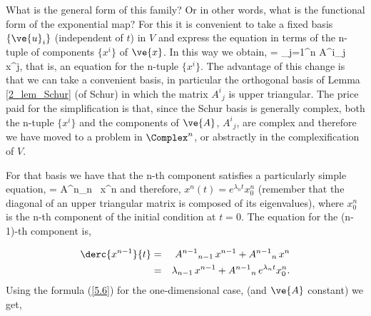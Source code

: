 
\noi What is the general form of this family? Or in other words,
what is the functional form of the exponential map?
For this it is convenient to take a fixed basis $\{\ve{u}_i\}$
(independent of $t$) in $V$ 
and express the equation in terms of the n-tuple of components $\{x^i\}$
of $\ve{x}$.
In this way we obtain,
\beq
{}= \sum_{j=1}^n A^i{}_j \, x^j,      \label{eqn:5.7_b}
\eeq
that is, an equation for the n-tuple $\{x^i\}$.
The advantage of this change is that we can take a convenient basis,
in particular the orthogonal basis of Lemma \ref{2_lem_Schur} (of Schur)
in which the matrix $A^i{}_j$ is upper triangular.
The price paid for the simplification is that, since the Schur basis is generally complex, both the n-tuple $\{x^i\}$ and the
components of $\ve{A}$, $A^i{}_j$, are complex and therefore
we have moved to a problem in $\Complex^n$, or abstractly
in the complexification of $V$.

For that basis we have that the n-th component satisfies a
particularly simple equation,
\beq
{}=  A^n{}_n \, x^n    
\label{eqn:5.7_b_n}
\eeq
and therefore, $x^n(t) =  e^{\lambda_n t}x^n_0$ (remember that the 
diagonal of an upper triangular matrix is composed of its eigenvalues),
where $x^n_0$ is the n-th component of the initial condition at $t=0$.
The equation for the (n-1)-th component is,


\begin{eqnarray}
\derc{x^{n-1}}{t} &=&  A^{n-1}{}_{n-1} \, x^{n-1} + A^{n-1}{}_n \, x^n \\
                  &=& \lambda_{n-1} \, x^{n-1} + A^{n-1}{}_n \,e^{\lambda_n t}x^n_0 .
\label{eqn:5.7_b_n-1}
\end{eqnarray}
Using the formula (\ref{5.6}) for the one-dimensional case, (and $\ve{A}$
constant) we get,


